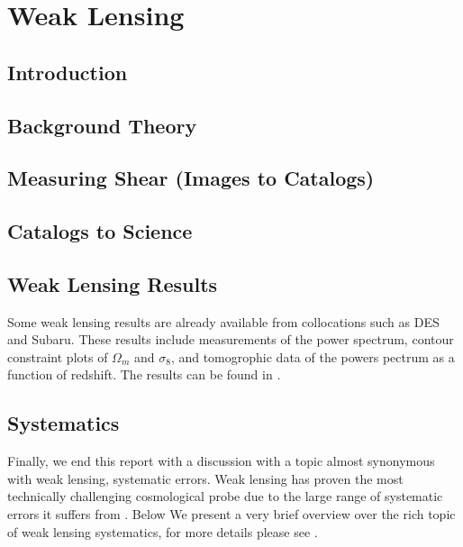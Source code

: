 \chapter{Weak Lensing}
\section{Introduction}


\section{Background Theory}



\section{Measuring Shear (Images to Catalogs)}


\section{Catalogs to Science}


\section{Weak Lensing Results}
Some weak lensing results are already available from collocations such as DES and Subaru. These results include measurements of the power spectrum, contour constraint plots of $\Omega_m$ and $\sigma_8$, and tomogrophic data of the powers pectrum as a function of redshift. The results can be found in \cite{Subaru_2019}.

\section{Systematics}
Finally, we end this report with a discussion with a topic almost synonymous with weak lensing, systematic errors. Weak lensing has proven the most technically challenging cosmological probe due to the large range of systematic errors it suffers from \cite{general_2013}. Below We present a very brief overview over the rich topic of weak lensing systematics, for more details please see \cite{massey_2013,general_2013}.

